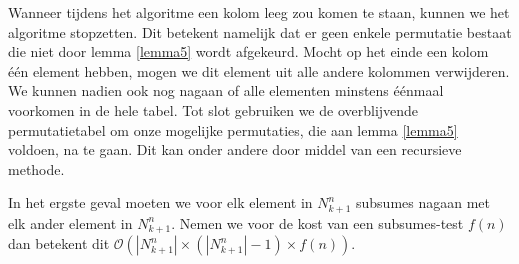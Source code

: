 \documentclass{article}
\begin{document}
Wanneer tijdens het algoritme een kolom leeg zou komen te staan, kunnen we het algoritme stopzetten.
Dit betekent namelijk dat er geen enkele permutatie bestaat die niet door lemma \ref{lemma5} wordt afgekeurd.
Mocht op het einde een kolom \'e\'en element hebben, mogen we dit element uit alle andere kolommen verwijderen.
We kunnen nadien ook nog nagaan of alle elementen minstens \'e\'enmaal voorkomen in de hele tabel.
Tot slot gebruiken we de overblijvende permutatietabel om onze mogelijke permutaties, die aan lemma \ref{lemma5} voldoen, na te gaan. 
Dit kan onder andere door middel van een recursieve methode.

In het ergste geval moeten we voor elk element in $N^n_{k+1}$ subsumes nagaan met elk ander element in $N^n_{k+1}$.
Nemen we voor de kost van een subsumes-test $f(n)$ dan betekent dit $\mathcal{O}\left(|N^n_{k+1}| \times \left(|N^n_{k+1}|-1\right) \times f(n) \right) $.
\end{document}
